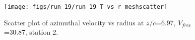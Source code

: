 \begin{figure}[H]
\centering
\texttt{[image: figs/run\_19/run\_19\_T\_vs\_r\_meshscatter]}
\caption{Scatter plot of azimuthal velocity vs radius at $z/c$=6.97, $V_{free}$=30.87, station 2.}
\label{fig:run_19_T_vs_r_meshscatter}
\end{figure}


